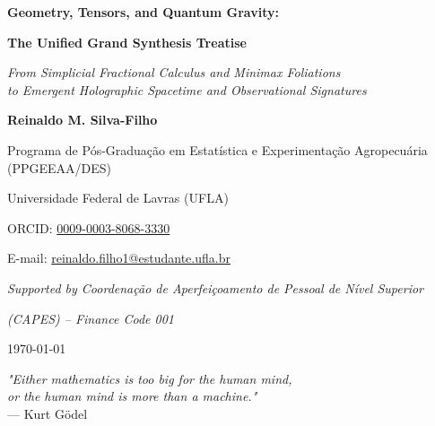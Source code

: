 \documentclass[11pt,a4paper,openright,twoside]{book}
\begin{document}
\frontmatter
\begin{titlepage}
    \centering
    \vspace*{2cm}
    
    {\Huge \textbf{Geometry, Tensors, and Quantum Gravity:} \par}
    \vspace{0.6cm}
    {\LARGE \textbf{The Unified Grand Synthesis Treatise} \par}
    \vspace{1cm}
    {\large \textit{From Simplicial Fractional Calculus and Minimax Foliations} \\ \textit{to Emergent Holographic Spacetime and Observational Signatures} \par}
    
    \vspace{3cm}
    
    {\Large \textbf{Reinaldo M. Silva-Filho} \par}
    \vspace{0.5cm}
    {\normalsize Programa de P\'os-Gradua\c{c}\~ao em Estat\'istica e Experimenta\c{c}\~ao Agropecu\'aria (PPGEEAA/DES) \par}
    {\normalsize Universidade Federal de Lavras (UFLA) \par}
    
    \vspace{0.8cm}
    {\normalsize ORCID: \href{https://orcid.org/0009-0003-8068-3330}{0009-0003-8068-3330} \par}
    {\normalsize E-mail: \href{mailto:reinaldo.filho1@estudante.ufla.br}{reinaldo.filho1@estudante.ufla.br} \par}
    
    \vspace{1.5cm}
    {\normalsize \textit{Supported by Coordena\c{c}\~ao de Aperfei\c{c}oamento de Pessoal de N\'ivel Superior} \par}
    {\normalsize \textit{(CAPES) -- Finance Code 001} \par}
    
    \vfill
    {\large \today \par}
\end{titlepage}

\vspace*{0.2\textheight}
\begin{flushright}
\textit{"Either mathematics is too big for the human mind, \\
or the human mind is more than a machine."} \\
\vspace{0.2cm}
--- Kurt G\"odel
\end{flushright}
\end{document}
